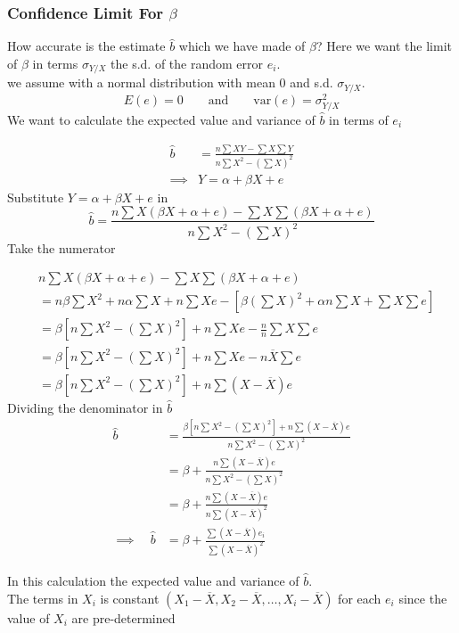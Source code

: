 \documentclass[11pt,a4paper]{article}
\theoremstyle{definition}
\begin{document}
\subsubsection{Confidence Limit For $\beta$}
How accurate is the estimate $\hat{b}$ which we have made of $\beta$? Here we want the limit of $\beta$ in terms $\sigma_{Y/X}$ the s.d. of the random error $e_i$.\\ we assume with a normal distribution with mean 0 and s.d. $\sigma_{Y/X}$.
\[E(e)=0\qquad \text{and}\qquad  \text{var}(e)=\sigma^2_{Y/X}\]
We want to calculate the expected value and variance of $\hat{b}$ in terms of $e_i$


\begin{align*}
\hat{b} &=\frac{n\sum XY-\sum X\sum Y}{n\sum X^2-\left(\sum X\right)^2}\\[1ex]
\implies &Y=\alpha +\beta X +e
\end{align*}
Substitute $Y=\alpha+\beta X+e$ in \[\hat{b}=\frac{n\sum X(\beta X+\alpha +e)-\sum X\sum (\beta X+\alpha +e)}{n\sum X^2-\left(\sum X\right)^2}\]
Take the numerator

\begin{align*}
&n\sum X(\beta X+\alpha +e)-\sum X\sum (\beta X+\alpha +e)\\[1ex] &= n\beta\sum X^2+n\alpha \sum X +n\sum Xe-\left[\beta \left(\sum X\right)^2+\alpha n\sum X +\sum X\sum e\right]\\[1ex]
&=\beta \left[n\sum X^2-\left(\sum X\right)^2\right]+n\sum Xe-\frac{n}{n}\sum X\sum e\\[1ex] &=\beta \left[n\sum X^2-\left(\sum X\right)^2\right] +n\sum Xe-n\overline{X}\sum e\\[1ex] &=\beta \left[n\sum X^2-\left(\sum X\right)^2\right]+n\sum (X-\overline{X})e
\end{align*}
Dividing the denominator in $\hat{b}$
\begin{align*}
\hat{b} &=\frac{\beta \left[n\sum X^2-\left(\sum X\right)^2\right]+n\sum (X-\overline{X})e}{n\sum X^2-\left(\sum X\right)^2}\\[1ex]
&=\beta +\frac{n\sum (X-\overline{X})e}{n\sum X^2-\left(\sum X\right)^2}\\[1ex]
&=\beta +\frac{n\sum (X-\overline{X})e}{n\sum (X-\overline{X})^2}\\[1ex]
\implies\quad  \hat{b}&=\beta +\frac{\sum (X-\overline{X})e_i}{\sum (X-\overline{X})^2}
\end{align*}

In this calculation the expected value and variance of $\hat{b}$.\\[1ex] The terms in $X_i$ is constant $(X_1-\overline{X}, X_2-\overline{X}, \ldots, X_i-\overline{X})$ for each $e_i$ since the value of $X_i$ are pre-determined
\end{document}
